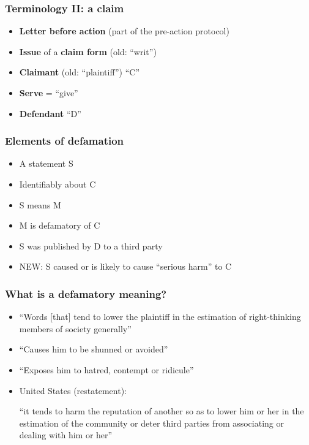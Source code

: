 \documentclass[ignorenonframetext,]{beamer}
\begin{document}
\begin{frame}
  \frametitle{Terminology II: a claim}
  \begin{itemize}
  \item {\bf Letter before action} (part of the pre-action protocol)
  \item {\bf Issue} of a {\bf claim form} (old: ``writ'')
  \item {\bf Claimant} (old: ``plaintiff'') ``C''
  \item {\bf Serve} = ``give''
  \item {\bf Defendant} ``D''
  \end{itemize}
\end{frame}

\begin{frame}
\frametitle{Elements of defamation}

\begin{itemize}
\item  A statement S
\item  Identifiably about C
\item  S means M
\item  M is defamatory of C
\item  S was published by D to a third party
\item  NEW: S caused or is likely to cause ``serious harm'' to C
\end{itemize}

\end{frame}

\begin{frame}
\frametitle{What is a defamatory meaning?}

\begin{itemize}
\item ``Words [that] tend to lower the plaintiff in the estimation of right-thinking members of society generally''
\item  ``Causes him to be shunned or avoided''
\item  ``Exposes him to hatred, contempt or ridicule''
\item  United States (restatement):

    ``it tends to harm the reputation of another so as to lower him or
    her in the estimation of the community or deter third parties from
    associating or dealing with him or her''

\end{itemize}

\end{frame}
\end{document}
